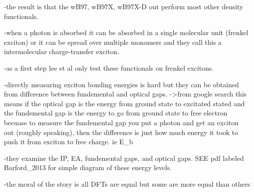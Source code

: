     -the result is that the wB97, wB97X, wB97X-D out perform most other density functionals.

    -when a photon is absorbed it can be absorbed in a single molecular unit (frenkel exciton)
    or it can be spread over multiple monomers and they call this a intermolecular charge-transfer
    exciton. 

    -as a first step lee et al only test these functionals on frenkel excitons. 

    -directly measuring exciton bonding energies is hard but they can be obtained from 
    difference between fundemental and optical gaps. ->from google search this means if the 
    optical gap is the energy from ground state to excitated stated and the fundemental gap
    is the energy to go from ground state to free electron becuase to measure the fundemental 
    gap you put a photon and get an exciton out (roughly speaking), then the difference is just
    how much energy it took to push it from exciton to free charge. ie E_{b}

    -they examine the IP, EA, fundemental gaps, and optical gaps. SEE pdf labeled Barford_2013
    for simple diagram of these energy levels.

    -the moral of the story is all DFTs are equal but some are more equal than others
    

